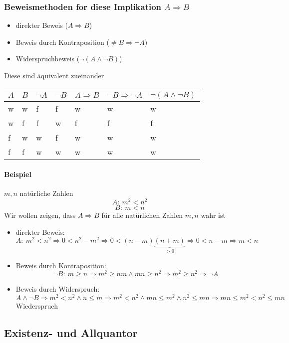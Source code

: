 \documentclass[a4paper]{scrartcl}
\theoremstyle{definition}
\theoremstyle{plain}
\theoremstyle{plain}
\theoremstyle{remark}
\theoremstyle{remark}
\theoremstyle{remark}
\begin{document}
\subsubsection{Beweismethoden for diese Implikation $A\Rightarrow B$}
\label{sec-2-2-2}
\begin{itemize}
\item direkter Beweis ($A\Rightarrow B$)
\item Beweis durch Kontraposition ($\neq B \Rightarrow \neg A$)
\item Widerspruchbeweis ($\neg (A\wedge \neg B)$)
\end{itemize}
Diese sind äquivalent zueinander
\begin{center}
\begin{tabular}{lllllll}
$A$ & $B$ & $\neg A$ & $\neg B$ & $A\Rightarrow B$ & $\neg B \Rightarrow \neg A$ & $\neg (A \wedge \neg B)$\\
\hline
w & w & f & f & w & w & w\\
w & f & f & w & f & f & f\\
f & w & w & f & w & w & w\\
f & f & w & w & w & w & w\\
\end{tabular}
\end{center}
\paragraph{Beispiel}
\label{sec-2-2-2-1}
$m,n$ natürliche Zahlen \\
     \[A:~m^2 < n^2\]
\[B:~m < n\]
Wir wollen zeigen, dass $A\Rightarrow B$ für alle natürlichen Zahlen $m,n$ wahr ist
\begin{itemize}
\item direkter Beweis: \\
       \[A:~m^2 < n^2 \Rightarrow 0 < n^2 - m^2 \Rightarrow 0 < (n-m)\underbrace{(n+m)}_{>0} \Rightarrow 0 < n-m \Rightarrow m<n\]
\item Beweis durch Kontraposition: \\
       \[\neg B:~m \geq n \Rightarrow m^2\geq n m \wedge m n \geq n^2 \Rightarrow m^2 \geq n^2 \Rightarrow \neg A\]
\item Beweis durch Widerspruch: \\
       \[A\wedge \neg B \Rightarrow m^2 < n^2 \wedge n\leq m \Rightarrow m^2 < n^2 \wedge m n \leq m^2 \wedge n^2 \leq m n \Rightarrow m n \leq m^2 < n^2 \leq m n\]
       Wiederspruch
\end{itemize}
\subsection{Existenz- und Allquantor}
\label{sec-2-3}
\end{document}
